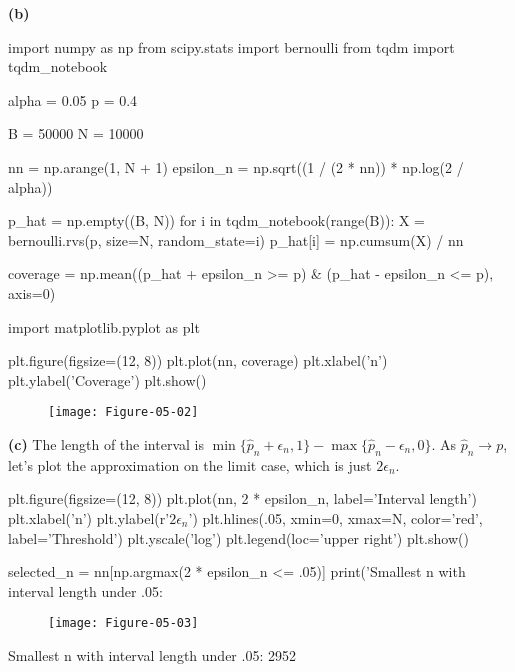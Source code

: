 \textbf{(b)}

\begin{python}
import numpy as np
from scipy.stats import bernoulli
from tqdm import tqdm_notebook

alpha = 0.05
p = 0.4

B = 50000
N = 10000

nn = np.arange(1, N + 1)
epsilon_n = np.sqrt((1 / (2 * nn)) * np.log(2 / alpha))

p_hat = np.empty((B, N))
for i in tqdm_notebook(range(B)):
    X = bernoulli.rvs(p, size=N, random_state=i)
    p_hat[i] = np.cumsum(X) / nn

coverage = np.mean((p_hat + epsilon_n >= p) & (p_hat - epsilon_n <= p), axis=0)
\end{python}

\begin{python}
import matplotlib.pyplot as plt

plt.figure(figsize=(12, 8))
plt.plot(nn, coverage)
plt.xlabel('n')
plt.ylabel('Coverage')
plt.show()
\end{python}

\begin{figure}[H]
\texttt{[image: Figure-05-02]}
\end{figure}

\textbf{(c)} The length of the interval is
\(\min \{\hat{p}_n + \epsilon_n, 1 \} - \max \{ \hat{p}_n - \epsilon_n, 0\}\).
As \(\hat{p}_n \rightarrow p\), let's plot the approximation on the
limit case, which is just \(2 \epsilon_n\).

\begin{python}
plt.figure(figsize=(12, 8))
plt.plot(nn, 2 * epsilon_n, label='Interval length')
plt.xlabel('n')
plt.ylabel(r'$2\epsilon_n$')
plt.hlines(.05, xmin=0, xmax=N, color='red', label='Threshold')
plt.yscale('log')
plt.legend(loc='upper right')
plt.show()

selected_n = nn[np.argmax(2 * epsilon_n <= .05)]
print('Smallest n with interval length under .05: %
\end{python}

\begin{figure}[H]
\texttt{[image: Figure-05-03]}
\end{figure}

\begin{console}
Smallest n with interval length under .05: 2952
\end{console}
